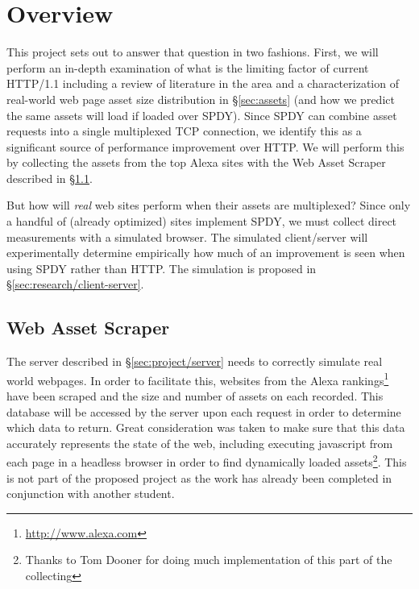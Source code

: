 \documentclass[11pt,letterpaper,notitlepage]{article}
\begin{document}
\section{Overview}
\label{sec:research/overview}
This project sets out to answer that question in two fashions. First, we will
perform an in-depth examination of what is the limiting factor of current
HTTP/1.1 including a review of literature in the area and a characterization of
real-world web page asset size distribution in \S\ref{sec:assets} (and
how we predict the same assets will load if loaded over SPDY). Since SPDY can
combine asset requests into a single multiplexed TCP connection, we identify
this as a significant source of performance improvement over HTTP. We will
perform this by collecting the assets from the top Alexa sites with the Web
Asset Scraper described in \S\ref{sec:research/scraper}.

But how will \textit{real} web sites perform when their assets are multiplexed?
Since only a handful of (already optimized) sites implement SPDY, we must
collect direct measurements with a simulated browser. The simulated
client/server will experimentally determine empirically how much of an
improvement is seen when using SPDY rather than HTTP.  The simulation is
proposed in \S\ref{sec:research/client-server}.

\subsection{Web Asset Scraper}
\label{sec:research/scraper}
The server described in \S\ref{sec:project/server} needs to correctly simulate
real world webpages. In order to facilitate this, websites from the Alexa
rankings\footnote{\url{http://www.alexa.com}} have been scraped and the size and
number of assets on each recorded.  This database will be accessed by the server
upon each request in order to determine which data to return.  Great
consideration was taken to make sure that this data accurately represents the
state of the web, including executing javascript from each page in a headless
browser in order to find dynamically loaded assets\footnote{Thanks to Tom Dooner
for doing much implementation of this part of the collecting}. This is not part
of the proposed project as the work has already been completed in conjunction
with another student.
\end{document}
